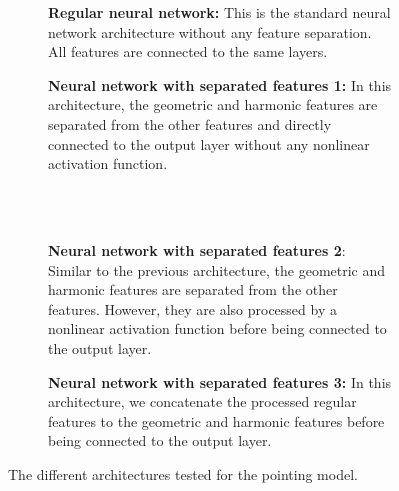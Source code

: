\begin{figure}[H]
    \centering
    \begin{subfigure}[t]{0.49\textwidth}
        \centering
        
        \caption{\textbf{Regular neural network:}
        This is the standard neural network architecture without any feature separation.
        All features are connected to the same layers.}
        \label{subfig:regular}
    \end{subfigure}
    \hfill
   \begin{subfigure}[t]{0.49\textwidth}
       \centering
       
       \caption{\textbf{Neural network with separated features 1:}
       In this architecture, the geometric and harmonic features are separated from the other features and directly connected to the output layer without any nonlinear activation function.}
       \label{subfig:comb_sep1}
\end{subfigure}
\\~\\
    \begin{subfigure}[t]{0.49\textwidth}
        \centering
        
        \caption{\textbf{Neural network with separated features 2}:
        Similar to the previous architecture, the geometric and harmonic features are separated from the other features.
        However, they are also processed by a nonlinear activation function before being connected to the output layer.}
        \label{subfig:comb_sep2}
    \end{subfigure}
    \hfill
       \begin{subfigure}[t]{0.49\textwidth}
        \centering
        
        \caption{\textbf{Neural network with separated features 3:}
        In this architecture, we concatenate the processed regular features to the geometric and harmonic features before being connected to the output layer.}
        \label{subfig:comb_sep3}
    \end{subfigure}
     \caption[Neural network architectures for pointing model]{The different architectures tested for the pointing model.}
     \label{fig:nn_architecture}
\end{figure}

